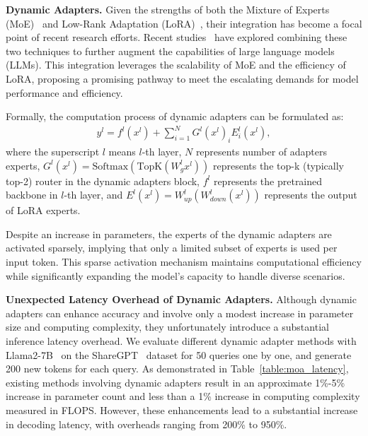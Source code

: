 \noindent\textbf{Dynamic Adapters.}
Given the strengths of both the Mixture of Experts (MoE)~\cite{jiang2024mixtral,artic2024,dbrx2024,xAI-2024} and Low-Rank Adaptation (LoRA)~\cite{Hu2021LoRALA}, their integration has become a focal point of recent research efforts. Recent studies~\cite{feng2024mixtureofloras,gao2024higher,gou2024mixture,liu2023moelora,luo2024moelora} have explored combining these two techniques to further augment the capabilities of large language models (LLMs). This integration leverages the scalability of MoE and the efficiency of LoRA, proposing a promising pathway to meet the escalating demands for model performance and efficiency. 

Formally, the computation process of dynamic adapters can be formulated as:
\begin{align}
    y^l = f^l(x^l) + \sum_{i = 1}^{N}{G^l(x^l)_iE^l_i(x^l)},
    \label{eq:moa_origin}
\end{align}
where the superscript $l$ means $l$-th layer, $N$ represents number of adapters experts, $G^l(x^l) = \text{Softmax}(\text{TopK}(W^l_gx^l))$ represents the top-k (typically top-2) router in the dynamic adapters block, $f^l$ represents the pretrained backbone in $l$-th layer, and $E^l(x^l) = W^l_{up}(W^l_{down}(x^l))$ represents the output of LoRA experts.

Despite an increase in parameters, the experts of the dynamic adapters are activated sparsely, implying that only a limited subset of experts is used per input token. This sparse activation mechanism maintains computational efficiency while significantly expanding the model's capacity to handle diverse scenarios.

\noindent\textbf{Unexpected Latency Overhead of Dynamic Adapters.}
Although dynamic adapters can enhance accuracy and involve only a modest increase in parameter size and computing complexity, they unfortunately introduce a substantial inference latency overhead. We evaluate different dynamic adapter methods with Llama2-7B~\cite{touvron2023llama} on the ShareGPT~\cite{openchat2023sharegpt4} dataset for 50 queries one by one, and generate 200 new tokens for each query. As demonstrated in Table~\ref{table:moa_latency}, existing methods involving dynamic adapters result in an approximate 1\%-5\% increase in parameter count and less than a 1\% increase in computing complexity measured in FLOPS. However, these enhancements lead to a substantial increase in decoding latency, with overheads ranging from 200\% to 950\%.

